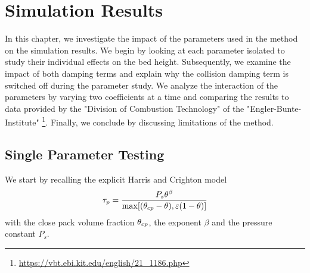 \newpage

\chapter{Simulation Results}
\label{ch:results}
In this chapter, we investigate the impact of the parameters used in the \MP method on the simulation results.
We begin by looking at each parameter isolated to study their individual effects on the bed height.
Subsequently, we examine the impact of both damping terms and explain why the collision damping term is switched off during the parameter study.
We analyze the interaction of the parameters by varying two coefficients at a time and comparing the results to data provided by the "Division of Combustion Technology" of the "Engler-Bunte-Institute" \footnote{\url{https://vbt.ebi.kit.edu/english/21_1186.php}}.
Finally, we conclude by discussing limitations of the \MP method.



\section{Single Parameter Testing}
\label{sec:oneParam}
We start by recalling the explicit Harris and Crighton model
\begin{equation}
    \tau_p = \dfrac{P_s \theta^\beta}{\max [( \theta_{cp} - \theta), \varepsilon ( 1- \theta)]}
\end{equation}
with the close pack volume fraction $\theta_{cp}$, the exponent $\beta$ and the pressure constant $P_s$.



